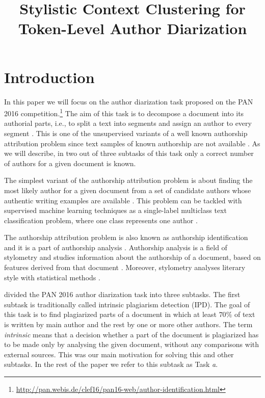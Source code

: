 \documentclass[10pt, a4paper]{article}
\title{Stylistic Context Clustering for Token-Level Author Diarization}
\begin{document}
\maketitleabstract

\section{Introduction}
In this paper we will focus on the author diarization task proposed on the PAN 2016 competition.\footnote{\url{http://pan.webis.de/clef16/pan16-web/author-identification.html}} The aim of this task is to decompose a document into its authorial parts, i.e., to split a text into segments and assign an author to every segment \citep{koppel-2011,aldebei-2015}. This is one of the unsupervised variants of a well known authorship attribution problem since text samples of known authorship are not available \citep{rosso-2016}. As we will describe, in two out of three subtasks of this task only a correct number of authors for a given document is known.

The simplest variant of the authorship attribution problem is about finding the most likely author for a given document from a set of candidate authors whose authentic writing examples are available \citep{stamatatos-2009a,stein-2011,ding-2016}. This problem can be tackled with supervised machine learning techniques as a {{{single-label}}} multiclass text classification problem, where one class represents one author \citep{stamatatos-2009a}. 

The authorship attribution problem is also known as authorship identification and it is a part of authorship analysis \citep{stamatatos-2009a,ding-2016}. Authorship analysis is a field of stylometry and studies information about the authorship of a document, based on features derived from that document \citep{layton-2013}. Moreover, stylometry analyses literary style with statistical methods  \citep{stein-2011}.	

\citet{rosso-2016} divided the PAN 2016 author diarization task into three subtasks. The first subtask is traditionally called intrinsic plagiarism detection (IPD). The goal of this task is to find plagiarized parts of a document in which at least $70\%$ of text is written by main author and the rest by one or more other authors. The term \emph{intrinsic} means that a decision whether a part of the document is plagiarized has to be made only by analysing the given document, without any comparisons with external sources. This was our main motivation for solving this and other subtasks. In the rest of the paper we refer to this subtask as Task \emph{a}.
\end{document}
